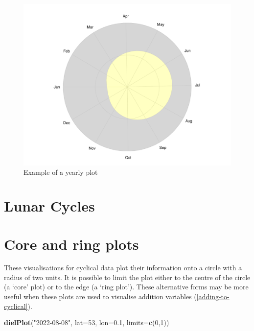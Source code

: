 \documentclass[
]{book}
\newenvironment{Shaded}{\begin{snugshade}}{\end{snugshade}}
\newcommand{\AttributeTok}[1]{\textcolor[rgb]{0.13,0.29,0.53}{#1}}
\newcommand{\DecValTok}[1]{\textcolor[rgb]{0.00,0.00,0.81}{#1}}
\newcommand{\FloatTok}[1]{\textcolor[rgb]{0.00,0.00,0.81}{#1}}
\newcommand{\FunctionTok}[1]{\textcolor[rgb]{0.13,0.29,0.53}{\textbf{#1}}}
\newcommand{\NormalTok}[1]{#1}
\newcommand{\StringTok}[1]{\textcolor[rgb]{0.31,0.60,0.02}{#1}}
\begin{document}
\begin{figure}

{\centering \includegraphics[width=0.9\linewidth]{_main_files/figure-latex/yearly-plot-1-1} 

}

\caption{Example of a yearly plot}\label{fig:yearly-plot-1}
\end{figure}

\hypertarget{lunar-cycles}{%
\section{Lunar Cycles}\label{lunar-cycles}}

\hypertarget{core-and-ring-plots}{%
\section{Core and ring plots}\label{core-and-ring-plots}}

These visualisations for cyclical data plot their information onto a circle with a radius of two units. It is possible to limit the plot either to the centre of the circle (a `core' plot) or to the edge (a `ring plot'). These alternative forms may be more useful when these plots are used to visualise addition variables (\ref{adding-to-cyclical}).

\begin{Shaded}
\begin{Highlighting}[]
\FunctionTok{dielPlot}\NormalTok{(}\StringTok{"2022{-}08{-}08"}\NormalTok{, }\AttributeTok{lat=}\DecValTok{53}\NormalTok{, }\AttributeTok{lon=}\FloatTok{0.1}\NormalTok{, }\AttributeTok{limits=}\FunctionTok{c}\NormalTok{(}\DecValTok{0}\NormalTok{,}\DecValTok{1}\NormalTok{))}
\end{Highlighting}
\end{Shaded}
\end{document}
